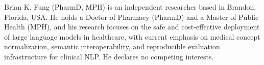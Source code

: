 \documentclass[journal]{IEEEtran}
\begin{document}
\printbibliography

\begin{IEEEbiographynophoto}{Brian K. Fung}
(PharmD, MPH) is an independent researcher based in Brandon, Florida,
USA. He holds a Doctor of Pharmacy (PharmD) and a Master of Public
Health (MPH), and his research focuses on the safe and cost-effective
deployment of large language models in healthcare, with current
emphasis on medical concept normalization, semantic interoperability,
and reproducible evaluation infrastructure for clinical NLP. He
declares no competing interests.
\end{IEEEbiographynophoto}
\end{document}
